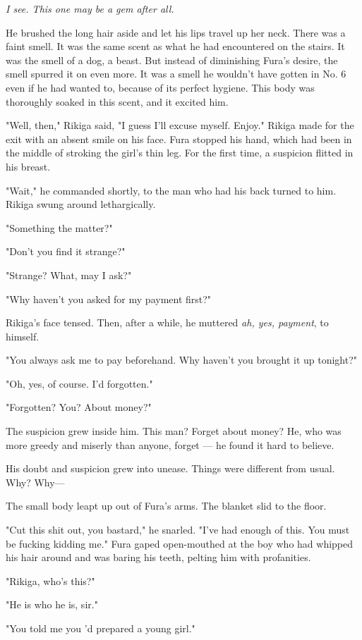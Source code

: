 \emph{I see. This one may be a gem after all.}

He brushed the long hair aside and let his lips travel up her neck.
There was a faint smell. It was the same scent as what he had
encountered on the stairs. It was the smell of a dog, a beast. But
instead of diminishing Fura's desire, the smell spurred it on even more.
It was a smell he wouldn't have gotten in No. 6 even if he had wanted
to, because of its perfect hygiene. This body was thoroughly soaked in
this scent, and it excited him.

"Well, then," Rikiga said, "I guess I'll excuse myself. Enjoy." Rikiga
made for the exit with an absent smile on his face. Fura stopped his
hand, which had been in the middle of stroking the girl's thin leg. For
the first time, a suspicion flitted in his breast.

"Wait," he commanded shortly, to the man who had his back turned to him.
Rikiga swung around lethargically.

"Something the matter?"

"Don't you find it strange?"

"Strange? What, may I ask?"

"Why haven't you asked for my payment first?"

Rikiga's face tensed. Then, after a while, he muttered \emph{ah, yes, payment},
to himself.

"You always ask me to pay beforehand. Why haven't you brought it up
tonight?"

"Oh, yes, of course. I'd forgotten."

"Forgotten? You? About money?"

The suspicion grew inside him. This man? Forget about money? He, who was
more greedy and miserly than anyone, forget --- he found it hard to
believe.

His doubt and suspicion grew into unease. Things were different from
usual. Why? Why---

The small body leapt up out of Fura's arms. The blanket slid to the
floor.

"Cut this shit out, you bastard," he snarled. "I've had enough of this.
You must be fucking kidding me." Fura gaped open-mouthed at the boy who
had whipped his hair around and was baring his teeth, pelting him with
profanities.

"Rikiga, who's this?"

"He is who he is, sir."

"You told me you 'd prepared a young girl."

